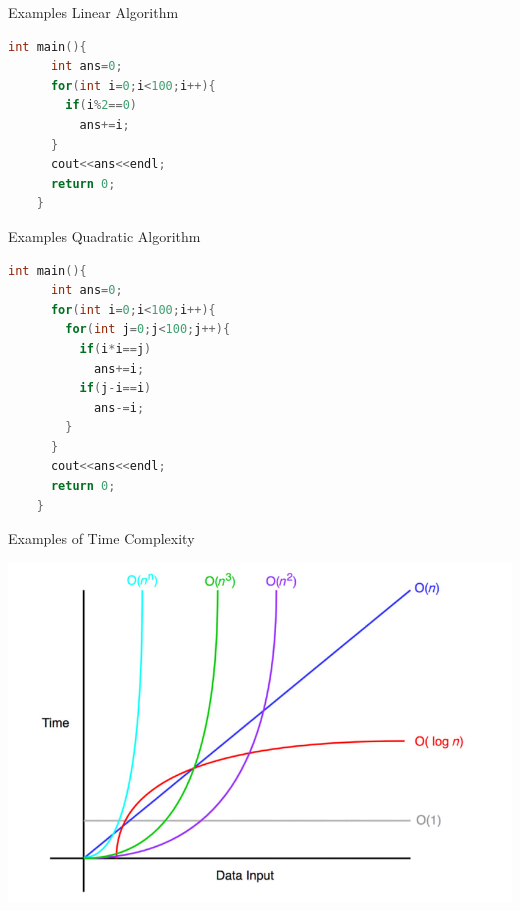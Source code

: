 \documentclass{beamer}
\begin{document}
\begin{frame}[fragile]{Examples Linear Algorithm}

  \begin{lstlisting}[language=C++]
    int main(){
      int ans=0;
      for(int i=0;i<100;i++){
        if(i%2==0)
          ans+=i;
      }
      cout<<ans<<endl;
      return 0;
    }
  \end{lstlisting}

\end{frame}

\begin{frame}[fragile]{Examples Quadratic Algorithm}

  \begin{lstlisting}[language=C++]
    int main(){
      int ans=0;
      for(int i=0;i<100;i++){
        for(int j=0;j<100;j++){
          if(i*i==j)
            ans+=i;
          if(j-i==i)
            ans-=i;
        }
      }
      cout<<ans<<endl;
      return 0;
    }
  \end{lstlisting}

\end{frame}

\begin{frame}{Examples of Time Complexity}
  \begin{center}
    \includegraphics[width=.85\linewidth]{../img/bigOchart}
  \end{center}
\end{frame}
\end{document}
